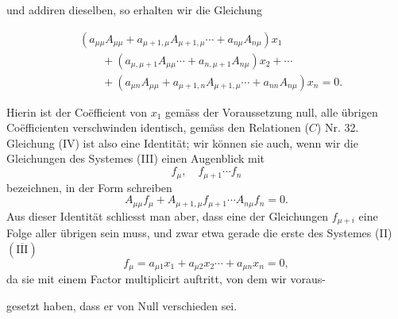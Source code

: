 \documentclass[11pt]{article}
\providecommand{\weberpage}[1]{}
\providecommand{\weq}[2]{\begin{equation}\tag{#1}#2\end{equation}}
\begin{document}
und addiren dieselben, so erhalten wir die Gleichung

\weq{IV}{
\begin{aligned}
&(a_{\mu\mu}A_{\mu\mu}+a_{\mu+1,\mu}A_{\mu+1,\mu}\cdots+a_{n\mu}A_{n\mu})x_1\\
&\qquad+(a_{\mu,\mu+1}A_{\mu\mu}\cdots+a_{n,\mu+1}A_{n\mu})x_2+\cdots\\
&\qquad+(a_{\mu n}A_{\mu\mu}+a_{\mu+1,n}A_{\mu+1,\mu}\cdots+a_{nn}A_{n\mu})x_n=0.
\end{aligned}
}


\weberpage{105}


Hierin ist der Co\"efficient von $x_1$ gem\"ass der Voraussetzung null, alle
\"ubrigen Co\"efficienten verschwinden identisch, gem\"ass den Relationen
($C$) Nr. 32. Gleichung (IV) ist also eine Identit\"at; wir k\"onnen sie
auch, wenn wir die Gleichungen des Systemes (III) einen Augenblick mit
\[
f_\mu, \quad f_{\mu+1} \cdots f_n
\]
bezeichnen, in der Form schreiben
\weq{V}{A_{\mu\mu} f_\mu + A_{\mu+1,\mu} f_{\mu+1} \cdots A_{n\mu} f_n = 0.}
Aus dieser Identit\"at schliesst man aber, dass eine der Gleichungen
$f_{\mu+i}$ eine Folge aller \"ubrigen sein muss, und zwar etwa gerade die
erste des Systemes (II) $(\overline{\mathrm{III}})$
\[
f_\mu = a_{\mu 1} x_1 + a_{\mu 2} x_2 \cdots + a_{\mu n} x_n = 0,
\]
da sie mit einem Factor multiplicirt auftritt, von dem wir voraus-


\weberpage{106}


gesetzt haben, dass er von Null verschieden sei.
\end{document}
